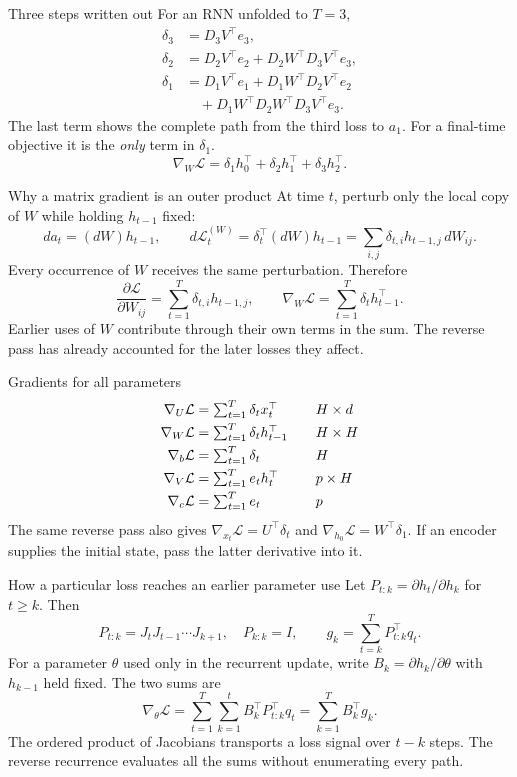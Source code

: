 \documentclass[aspectratio=169,11pt]{beamer}
\begin{document}
\begin{frame}{Three steps written out}
For an RNN unfolded to $T=3$,
\begin{align*}
\delta_3 &= D_3V^\top e_3,\\
\delta_2 &= D_2V^\top e_2 + D_2W^\top D_3V^\top e_3,\\
\delta_1 &= D_1V^\top e_1 + D_1W^\top D_2V^\top e_2\\
         &\quad + D_1W^\top D_2W^\top D_3V^\top e_3.
\end{align*}
The last term shows the complete path from the third loss to $a_1$.
For a final-time objective it is the \emph{only} term in $\delta_1$.
\[
\nabla_W\mathcal L=\delta_1h_0^\top+\delta_2h_1^\top+\delta_3h_2^\top .
\]
\end{frame}

\begin{frame}{Why a matrix gradient is an outer product}
At time $t$, perturb only the local copy of $W$ while holding $h_{t-1}$ fixed:
\[
da_t=(dW)h_{t-1},\qquad
d\mathcal L_t^{(W)}=\delta_t^\top(dW)h_{t-1}
=\sum_{i,j}\delta_{t,i}h_{t-1,j}\,dW_{ij}.
\]
Every occurrence of $W$ receives the same perturbation. Therefore
\[
\boxed{\frac{\partial\mathcal L}{\partial W_{ij}}
 =\sum_{t=1}^T\delta_{t,i}h_{t-1,j},\qquad
 \nabla_W\mathcal L=\sum_{t=1}^T\delta_t h_{t-1}^\top.}
\]
Earlier uses of $W$ contribute through their own terms in the sum. The
reverse pass has already accounted for the later losses they affect.
\end{frame}
\begin{frame}{Gradients for all parameters}
\[
\begin{array}{r@{\;}c@{\;}l@{\qquad}l}
\nabla_U\mathcal L&=&\sum_{t=1}^T\delta_t x_t^\top & H\times d\\[3pt]
\nabla_W\mathcal L&=&\sum_{t=1}^T\delta_t h_{t-1}^\top & H\times H\\[3pt]
\nabla_b\mathcal L&=&\sum_{t=1}^T\delta_t & H\\[3pt]
\nabla_V\mathcal L&=&\sum_{t=1}^T e_t h_t^\top & p\times H\\[3pt]
\nabla_c\mathcal L&=&\sum_{t=1}^T e_t & p
\end{array}
\]
The same reverse pass also gives
$\nabla_{x_t}\mathcal L=U^\top\delta_t$ and
$\nabla_{h_0}\mathcal L=W^\top\delta_1$.
If an encoder supplies the initial state, pass the latter derivative into it.
\end{frame}
\begin{frame}{How a particular loss reaches an earlier parameter use}
Let $P_{t:k}=\partial h_t/\partial h_k$ for $t\geq k$. Then
\[
P_{t:k}=J_tJ_{t-1}\cdots J_{k+1},\quad P_{k:k}=I,\qquad
g_k=\sum_{t=k}^TP_{t:k}^\top q_t.
\]
For a parameter $\theta$ used only in the recurrent update, write
$B_k=\partial h_k/\partial\theta$ with $h_{k-1}$ held fixed. The two sums are
\[
\boxed{\nabla_\theta\mathcal L=
 \sum_{t=1}^T\sum_{k=1}^t B_k^\top P_{t:k}^\top q_t
 =\sum_{k=1}^T B_k^\top g_k.}
\]
The ordered product of Jacobians transports a loss signal over $t-k$ steps.
The reverse recurrence evaluates all the sums without enumerating every path.
\end{frame}
\end{document}
